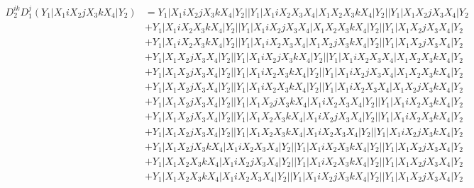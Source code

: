 \documentclass{article}[12pt]
\begin{document}
\begin{align*}
D_2^{ik}D_1^j(Y_1|X_1iX_2jX_3kX_4|Y_2)& =Y_1|X_1iX_2jX_3kX_4|Y_2||Y_1|X_1iX_2X_3X_4|X_1X_2X_3kX_4|Y_2||Y_1|X_1X_2jX_3X_4|Y_2\\ 
 & +Y_1|X_1iX_2X_3kX_4|Y_2||Y_1|X_1iX_2jX_3X_4|X_1X_2X_3kX_4|Y_2||Y_1|X_1X_2jX_3X_4|Y_2\\ 
 & +Y_1|X_1iX_2X_3kX_4|Y_2||Y_1|X_1iX_2X_3X_4|X_1X_2jX_3kX_4|Y_2||Y_1|X_1X_2jX_3X_4|Y_2\\ 
 & +Y_1|X_1X_2jX_3X_4|Y_2||Y_1|X_1iX_2jX_3kX_4|Y_2||Y_1|X_1iX_2X_3X_4|X_1X_2X_3kX_4|Y_2\\ 
 & +Y_1|X_1X_2jX_3X_4|Y_2||Y_1|X_1iX_2X_3kX_4|Y_2||Y_1|X_1iX_2jX_3X_4|X_1X_2X_3kX_4|Y_2\\ 
 & +Y_1|X_1X_2jX_3X_4|Y_2||Y_1|X_1iX_2X_3kX_4|Y_2||Y_1|X_1iX_2X_3X_4|X_1X_2jX_3kX_4|Y_2\\ 
 & +Y_1|X_1X_2jX_3X_4|Y_2||Y_1|X_1X_2jX_3kX_4|X_1iX_2X_3X_4|Y_2||Y_1|X_1iX_2X_3kX_4|Y_2\\ 
 & +Y_1|X_1X_2jX_3X_4|Y_2||Y_1|X_1X_2X_3kX_4|X_1iX_2jX_3X_4|Y_2||Y_1|X_1iX_2X_3kX_4|Y_2\\ 
 & +Y_1|X_1X_2jX_3X_4|Y_2||Y_1|X_1X_2X_3kX_4|X_1iX_2X_3X_4|Y_2||Y_1|X_1iX_2jX_3kX_4|Y_2\\ 
 & +Y_1|X_1X_2jX_3kX_4|X_1iX_2X_3X_4|Y_2||Y_1|X_1iX_2X_3kX_4|Y_2||Y_1|X_1X_2jX_3X_4|Y_2\\ 
 & +Y_1|X_1X_2X_3kX_4|X_1iX_2jX_3X_4|Y_2||Y_1|X_1iX_2X_3kX_4|Y_2||Y_1|X_1X_2jX_3X_4|Y_2\\ 
 & +Y_1|X_1X_2X_3kX_4|X_1iX_2X_3X_4|Y_2||Y_1|X_1iX_2jX_3kX_4|Y_2||Y_1|X_1X_2jX_3X_4|Y_2\end{align*}
\end{document}
